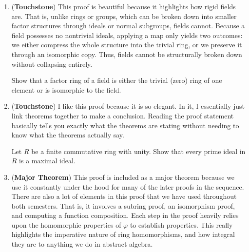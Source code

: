 \begin{enumerate}[label=\textbf{\arabic*.}]
    \item (\textbf{Touchstone}) This proof is beautiful because it highlights how rigid fields are. That is, unlike rings or groups, which can be broken down into smaller factor structures through ideals or normal subgroups, fields cannot. Because a field possesses no nontrivial ideals, applying a map only yields two outcomes: we either compress the whole structure into the trivial ring, or we preserve it through an isomorphic copy. Thus, fields cannot be structurally broken down without collapsing entirely.

    \begin{problem}
        Show that a factor ring of a field is either the trivial (zero) ring of one element or is isomorphic to the field. 
    \end{problem}

    \item (\textbf{Touchstone}) I like this proof because it is so elegant. In it, I essentially just link theorems together to make a conclusion. Reading the proof statement basically tells you exactly what the theorems are stating without needing to know what the theorems actually say. 

    \begin{problem}
        Let \(R\) be a finite commutative ring with unity. Show that every prime ideal in \(R\) is a maximal ideal.
    \end{problem}
    \newpage
    \item (\textbf{Major Theorem}) This proof is included as a major theorem because we use it constantly under the hood for many of the later proofs in the sequence. There are also a lot of elements in this proof that we have used throughout both semesters. That is, it involves a subring proof, an isomorphism proof, and computing a function composition. Each step in the proof heavily relies upon the homomorphic properties of \(\varphi\) to establish properties. This really highlights the imperative nature of ring homomorphisms, and how integral they are to anything we do in abstract algebra.  


\end{enumerate}
